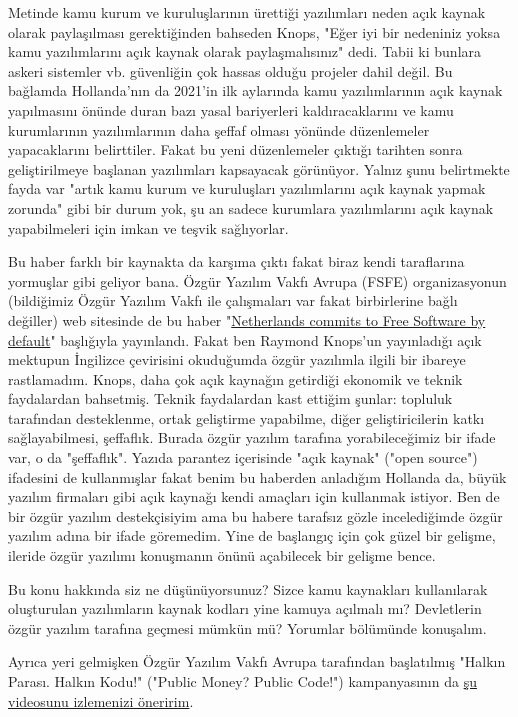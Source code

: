 \documentclass[11pt]{article}
\begin{document}
Metinde kamu kurum ve kuruluşlarının ürettiği yazılımları neden açık kaynak
olarak paylaşılması gerektiğinden bahseden Knops, "Eğer iyi bir nedeniniz
yoksa kamu yazılımlarını açık kaynak olarak paylaşmalısınız" dedi. Tabii ki
bunlara askeri sistemler vb. güvenliğin çok hassas olduğu projeler dahil
değil. Bu bağlamda Hollanda'nın da 2021'in ilk aylarında kamu yazılımlarının
açık kaynak yapılmasını önünde duran bazı yasal bariyerleri kaldıracaklarını
ve kamu kurumlarının yazılımlarının daha şeffaf olması yönünde düzenlemeler
yapacaklarını belirttiler. Fakat bu yeni düzenlemeler çıktığı tarihten sonra
geliştirilmeye başlanan yazılımları kapsayacak görünüyor. Yalnız şunu
belirtmekte fayda var "artık kamu kurum ve kuruluşları yazılımlarını açık
kaynak yapmak zorunda" gibi bir durum yok, şu an sadece kurumlara
yazılımlarını açık kaynak yapabilmeleri için imkan ve teşvik sağlıyorlar.

Bu haber farklı bir kaynakta da karşıma çıktı fakat biraz kendi taraflarına
yormuşlar gibi geliyor bana. Özgür Yazılım Vakfı Avrupa (FSFE) organizasyonun
(bildiğimiz Özgür Yazılım Vakfı ile çalışmaları var fakat birbirlerine bağlı
değiller) web sitesinde de bu haber "\href{https://fsfe.org/news/2020/news-20200424-01.html}{Netherlands commits to Free Software by
default}" başlığıyla yayınlandı. Fakat ben Raymond Knops'un yayınladığı açık
mektupun İngilizce çevirisini okuduğumda özgür yazılımla ilgili bir ibareye
rastlamadım. Knops, daha çok açık kaynağın getirdiği ekonomik ve teknik
faydalardan bahsetmiş. Teknik faydalardan kast ettiğim şunlar: topluluk
tarafından desteklenme, ortak geliştirme yapabilme, diğer geliştiricilerin
katkı sağlayabilmesi, şeffaflık. Burada özgür yazılım tarafına yorabileceğimiz
bir ifade var, o da "şeffaflık". Yazıda parantez içerisinde "açık kaynak"
("open source") ifadesini de kullanmışlar fakat benim bu haberden anladığım
Hollanda da, büyük yazılım firmaları gibi açık kaynağı kendi amaçları için
kullanmak istiyor. Ben de bir özgür yazılım destekçisiyim ama bu habere
tarafsız gözle incelediğimde özgür yazılım adına bir ifade göremedim. Yine de
başlangıç için çok güzel bir gelişme, ileride özgür yazılımı konuşmanın önünü
açabilecek bir gelişme bence.

Bu konu hakkında siz ne düşünüyorsunuz? Sizce kamu kaynakları kullanılarak
oluşturulan yazılımların kaynak kodları yine kamuya açılmalı mı? Devletlerin
özgür yazılım tarafına geçmesi mümkün mü? Yorumlar bölümünde konuşalım.

Ayrıca yeri gelmişken Özgür Yazılım Vakfı Avrupa tarafından başlatılmış
"Halkın Parası. Halkın Kodu!" ("Public Money? Public Code!") kampanyasının da
\href{https://www.youtube.com/watch?v=iuVUzg6x2yo}{şu videosunu izlemenizi öneririm}.
\end{document}
